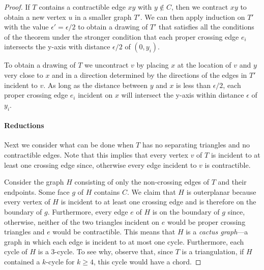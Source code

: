 \documentclass{patmorin}
\begin{document}
\begin{proof}
   If $T$ contains a contractible edge $xy$ with $y\not\in C$,
   then we contract $xy$ to obtain a new vertex $u$ in a smaller
   graph $T'$.   We can then apply induction on $T'$ with the
   value $\epsilon'=\epsilon/2$ to obtain a drawing of $T'$ that satisfies
   all the conditions of the theorem under the stronger condition that
   each proper crossing edge $e_i$ intersects the y-axis with distance
   $\epsilon/2$ of $(0,y_i)$.

   To obtain a drawing of $T$ we uncontract $v$ by placing $x$ at
   the location of $v$ and $y$ very close to $x$ and in a direction
   determined by the directions of the edges in $T'$ incident to $v$.
   As long as the distance between $y$ and $x$ is less than $\epsilon/2$,
   each proper crossing edge $e_i$ incident on $x$ will intersect the
   y-axis within distance $\epsilon$ of $y_i$.

   \paragraph{Reductions}
   Next we consider what can be done when $T$ has no separating
   triangles and no contractible edges.  Note that this implies that
   every vertex $v$ of $T$ is incident to at least one crossing edge
   since, otherwise every edge incident to $v$ is contractible.
  
   Consider the graph $H$ consisting of only the non-crossing edges of $T$
   and their endpoints.  Some face $g$ of $H$ contains $C$.  We claim
   that $H$ is outerplanar because every vertex of $H$ is incident to
   at least one crossing edge and is therefore on the boundary of $g$.
   Furthermore, every edge $e$ of $H$ is on the boundary of $g$ since,
   otherwise, neither of the two triangles incident on $e$ would be proper
   crossing triangles and $e$ would be contractible.  This means that
   $H$ is a \emph{cactus graph}---a graph in which each edge is incident
   to at most one cycle.  Furthermore, each cycle of $H$ is a 3-cycle.
   To see why, observe that, since $T$ is a triangulation, if $H$
   contained a $k$-cycle for $k\ge 4$, this cycle would have a chord.


\end{proof}
\end{document}

